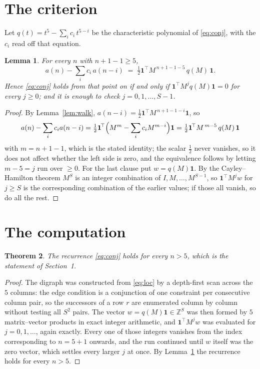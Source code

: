 \documentclass[11pt,a4paper]{article}
\theoremstyle{plain}
\newtheorem{theorem}{Theorem}
\newtheorem{lemma}[theorem]{Lemma}
\theoremstyle{definition}
\begin{document}
\section{The criterion}

Let $q(t)=t^{5}-\sum_i c_i\,t^{5-i}$ be the characteristic polynomial of
\eqref{eq:conj}, with the $c_i$ read off that equation.

\begin{lemma}\label{lem:crit}
For every $n$ with $n+1-1\ge5$,
\[
a(n)-\sum_i c_i\,a(n-i)\;=\;\tfrac1{2}\mathbf{1}^{\!\top}M^{\,n+1-1-5}\,q(M)\,\mathbf{1} .
\]
Hence \eqref{eq:conj} holds from that point on if and only if
$\mathbf{1}^{\!\top}M^{j}q(M)\mathbf{1}=0$ for every $j\ge0$; and it is enough to check
$j=0,1,\dots,S-1$.
\end{lemma}

\begin{proof}
By Lemma~\ref{lem:walk}, $a(n-i)=\tfrac1{2}\mathbf{1}^{\!\top}M^{\,n+1-1-i}\mathbf{1}$, so
\[
a(n)-\sum_i c_i a(n-i)
=\tfrac1{2}\mathbf{1}^{\!\top}\Bigl(M^{m}-\sum_i c_i M^{m-i}\Bigr)\mathbf{1}
=\tfrac1{2}\mathbf{1}^{\!\top}M^{\,m-5}\,q(M)\,\mathbf{1}
\]
with $m=n+1-1$, which is the stated identity; the scalar $\tfrac1{2}$ never vanishes, so it does not affect whether the left side is zero, and the equivalence follows by letting
$m-5=j$ run over $\ge0$. For the last clause put $w=q(M)\mathbf{1}$. By the
Cayley--Hamilton theorem $M^{S}$ is an integer combination of $I,M,\dots,M^{S-1}$, so
$\mathbf{1}^{\!\top}M^{j}w$ for $j\ge S$ is the corresponding combination of the earlier
values; if those all vanish, so do all the rest.
\end{proof}

\section{The computation}

\begin{theorem}
The recurrence \eqref{eq:conj} holds for every $n>5$, which is the statement of
Section~1.
\end{theorem}

\begin{proof}
The digraph was constructed from \eqref{eq:loc} by a depth-first scan across the $5$
columns: the edge condition is a conjunction of one constraint per consecutive column
pair, so the successors of a row $r$ are enumerated column by column without testing all
$S^2$ pairs. The vector $w=q(M)\mathbf{1}\in\mathbb{Z}^{S}$ was then formed by $5$
matrix--vector products in exact integer arithmetic, and $\mathbf{1}^{\!\top}M^{j}w$ was
evaluated for $j=0,1,\dots$, again exactly. Every one of those integers vanishes from the
index corresponding to $n=5+1$ onwards, and the run continued until $w$ itself was the
zero vector, which settles every larger $j$ at once. By Lemma~\ref{lem:crit} the recurrence
holds for every $n>5$.
\end{proof}
\end{document}
